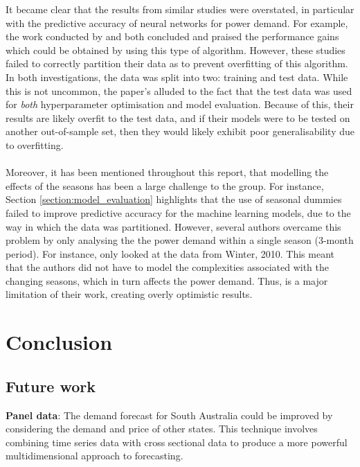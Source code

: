 \documentclass[11pt]{article}
\begin{document}
It became clear that the results from similar studies were overstated, in particular with the predictive accuracy of neural networks for power demand. For example, the work conducted by \citet{kotillova_statistical_2012} and \citet{bunn_forecasting_2000} both concluded and praised the performance gains which could be obtained by using this type of algorithm. However, these studies failed to correctly partition their data as to prevent overfitting of this algorithm. In both investigations, the data was split into two: training and test data. While this is not uncommon, the paper's alluded to the fact that the test data was used for \textit{both} hyperparameter optimisation and model evaluation. Because of this, their results are likely overfit to the test data, and if their models were to be tested on another out-of-sample set, then they would likely exhibit poor generalisability due to overfitting. 
\\
\\
Moreover, it has been mentioned throughout this report, that modelling the effects of the seasons has been a large challenge to the group. For instance, Section \ref{section:model_evaluation} highlights that the use of seasonal dummies failed to improve predictive accuracy for the machine learning models, due to the way in which the data was partitioned. However, several authors overcame this problem by only analysing the the power demand within a single season (3-month period). For instance, \citet{kotillova_statistical_2012} only looked at the data from Winter, 2010. This meant that the authors did not have to model the complexities associated with the changing seasons, which in turn affects the power demand. Thus, is a major limitation of their work, creating overly optimistic results.


\section{Conclusion}


\subsection{Future work}

\textbf{Panel data}: The demand forecast for South Australia could be improved by considering the demand and price of other states. This technique involves combining time series data with cross sectional data to produce a more powerful multidimensional approach to forecasting.
\\
\end{document}
